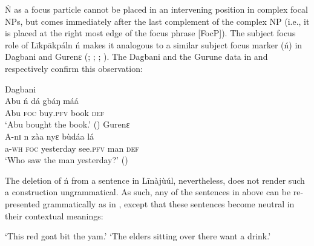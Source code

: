 \documentclass[output=paper,colorlinks,citecolor=brown]{langscibook}
\begin{document}
Ń as a focus particle cannot be placed in an intervening position in complex focal NPs, but comes immediately after the last complement of the complex NP (i.e., it is placed at the right most edge of the focus phrase [FocP]). The subject focus role of Līkpākpáln ń makes it analogous to a similar subject focus marker (ń) in Dagbani and Gurenɛ (\citealt[4]{Dakubu2003}; \citealt[169]{Issah2013Focus}; \citealt[5]{IssahSmith2018}; \citealt[169]{Akrofi-Ansah2014}). The Dagbani and the Gurune data in  and  respectively confirm this observation:

\ea%
    \label{ex:bisilki:10}
    \ea\label{ex:bisilki:10a}
    Dagbani\\
    \gll    Abu	ń	dá		gbáŋ	máá\\
            Abu	\textsc{foc}	buy\textsc{.pfv}	book	\textsc{def}\\
    \glt    ‘Abu bought the book.’ \hfill (\citealt[5]{IssahSmith2018})
    \ex\label{ex:bisilki:10b}
    Gurenɛ\\
    \gll    A-nɪ	n	zàa		nyɛ		bùdáa	lá\\
            a\textsc{-wh}	\textsc{foc}	yesterday	see\textsc{.pfv}	man	\textsc{def}\\
    \glt    ‘Who saw the man yesterday?’ \hfill (\citealt[4]{Dakubu2003})
    \z
\z

The deletion of ń from a sentence in Līnàjùúl, nevertheless, does not render such a construction ungrammatical. As such, any of the sentences in  above can be re-presented grammatically as in , except that these sentences become neutral in their contextual meanings:

\ea%
    \label{ex:bisilki:11}
    \jambox*{[neutral]}
    \glt    ‘This red goat bit the yam.’
    \jambox*{[neutral]}
    \glt    ‘The elders sitting over there want a drink.’
    \z
\z
\end{document}
